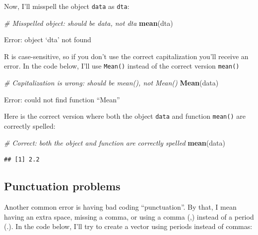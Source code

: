 \documentclass[
]{book}
\newenvironment{Shaded}{\begin{snugshade}}{\end{snugshade}}
\newcommand{\CommentTok}[1]{\textcolor[rgb]{0.56,0.35,0.01}{\textit{#1}}}
\newcommand{\KeywordTok}[1]{\textcolor[rgb]{0.13,0.29,0.53}{\textbf{#1}}}
\newcommand{\NormalTok}[1]{#1}
\begin{document}
Now, I'll misspell the object \texttt{data} as \texttt{dta}:

\begin{Shaded}
\begin{Highlighting}[]
\CommentTok{# Misspelled object: should be data, not dta}
\KeywordTok{mean}\NormalTok{(dta)}
\end{Highlighting}
\end{Shaded}

\begin{error}

Error: object `dta' not found

\end{error}

R is case-sensitive, so if you don't use the correct capitalization you'll receive an error. In the code below, I'll use \texttt{Mean()} instead of the correct version \texttt{mean()}

\begin{Shaded}
\begin{Highlighting}[]
\CommentTok{# Capitalization is wrong: should be mean(), not Mean()}
\KeywordTok{Mean}\NormalTok{(data)}
\end{Highlighting}
\end{Shaded}

\begin{error}

Error: could not find function ``Mean''

\end{error}

Here is the correct version where both the object \texttt{data} and function \texttt{mean()} are correctly spelled:

\begin{Shaded}
\begin{Highlighting}[]
\CommentTok{# Correct: both the object and function are correctly spelled}
\KeywordTok{mean}\NormalTok{(data)}
\end{Highlighting}
\end{Shaded}

\begin{verbatim}
## [1] 2.2
\end{verbatim}

\hypertarget{punctuation-problems}{%
\subsection{Punctuation problems}\label{punctuation-problems}}

Another common error is having bad coding ``punctuation''. By that, I mean having an extra space, missing a comma, or using a comma (,) instead of a period (.). In the code below, I'll try to create a vector using periods instead of commas:
\end{document}
